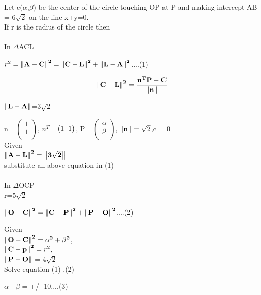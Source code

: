 \documentclass[10pt, a4paper]{article}
\let\vec\mathbf
\begin{document}
Let c($\alpha$,$\beta$) be the center of the circle touching OP at P and making intercept AB = 6$\sqrt{2}$  on the line x+y=0.\\
If r is the radius of the circle then\\
\\
In $\Delta$ACL
\begin{center}
$r^2 = \vec{\norm{A-C}^2} = \vec{\norm{C-L}^2 + \norm{L-A}^2}$....(1) 
\end{center}
\begin{align*}
\vec{\norm{C-L}^2} = \vec{\frac{n^TP-C}{\norm{n}}}\\
\end{align*}
\begin{center}
$ \vec{\norm{L-A}}$=3$\sqrt{2}$\\
 \end{center}
n =$ \begin{pmatrix}1\\1\\ \end{pmatrix}$, 
$n^T$ =$ \begin{pmatrix}1 \hspace{0.2cm}1 \end{pmatrix}$, 
P =$ \begin{pmatrix}\alpha\\ \beta\\ \end{pmatrix}$, 
$\vec{\norm{n}} = \sqrt{2}$,c = 0\\
Given\\
$\vec{\norm{A-L}^2} = \vec{\norm{3\sqrt{2}}}$\\
substitute  all above equation in (1) \\
\\
In $\Delta$OCP\\r=5$\sqrt{2}$
\begin{center}
$\vec{\norm{O-C}^2} = \vec{\norm{C-P}^2 + \norm{P-O}^2}$....(2) \\
\end{center}
Given\\
$\vec{\norm{O-C}^2} = \vec{{\alpha}^2 + {\beta}^2}$,\\
$\vec{\norm{C-p}^2} = r^2$,\\
$\vec{\norm{P-O}}$ = 4$\sqrt{2}$\\
Solve equation (1) ,(2)\\
\begin{center}
$\alpha$ - $\beta$ = +/- 10....(3)\\
\end{center}
\end{document}
